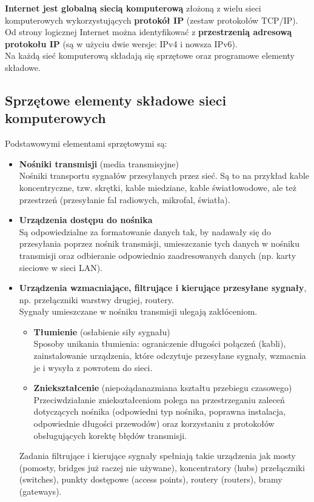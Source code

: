 \documentclass[a4paper]{article}
\begin{document}
\textbf{Internet jest globalną	 siecią	 komputerową} złożoną z	 wielu	 sieci	 komputerowych wykorzystujących	 \textbf{protokół IP} (zestaw protokołów TCP/IP). Od strony	 logicznej	 Internet można	identyfikować	z	\textbf{przestrzenią	adresową	protokołu	IP}	 (są	w użyciu	dwie wersje:	IPv4 i nowsza IPv6).\\
Na	każdą	sieć	komputerową	składają	się	sprzętowe	oraz	programowe	elementy	składowe.

\subsection{Sprzętowe	elementy	składowe	sieci	komputerowych}
Podstawowymi	elementami	sprzętowymi	są:
\begin{itemize}
    \item \textbf{Nośniki	transmisji}	(media	transmisyjne)\\
    Nośniki	 transportu	 sygnałów	 przesyłanych	 przez	 sieć. Są to na przykład kable koncentryczne, tzw.
    skrętki, kable miedziane,  kable	 światłowodowe,	 ale	 też	 przestrzeń (przesyłanie	fal	radiowych,	mikrofal,	światła).
    \item \textbf{Urządzenia	dostępu do	nośnika}\\
    Są odpowiedzialne za	formatowanie danych	tak, by nadawały się do	 przesyłania poprzez nośnik	 transmisji, umieszczanie	 tych	 danych	 w nośniku	transmisji	oraz	odbieranie	odpowiednio zaadresowanych	danych	(np. karty sieciowe w sieci LAN).
    \item \textbf{Urządzenia	wzmacniające,	filtrujące	i	kierujące	przesyłane	sygnały},	np.	przełączniki warstwy	drugiej, routery.\\
    Sygnały	 umieszczane w	 nośniku transmisji ulegają zakłóceniom.
    \begin{itemize}
        \item \textbf{Tłumienie} (osłabienie siły sygnału)\\
        Sposoby unikania tłumienia:  ograniczenie	 długości	 połączeń	 (kabli), zainstalowanie	urządzenia,	które odczytuje	przesyłane	sygnały,	wzmacnia	je	i
        wysyła	z	powrotem	do	sieci.
        \item \textbf{Zniekształcenie} (niepożądanazmiana kształtu przebiegu czasowego)\\
        Przeciwdziałanie	 zniekształceniom polega	 na	 przestrzeganiu	 zaleceń dotyczących	 nośnika	 (odpowiedni typ nośnika, poprawna instalacja, odpowiednie	 długości	 przewodów) oraz korzystaniu z protokołów obsługujących korektę	błędów	transmisji.
    \end{itemize}
    Zadania	filtrujące	i	kierujące	sygnały	spełniają	takie	urządzenia	jak	mosty (pomosty,	bridges już	 raczej	 nie	 używane),	 koncentratory (hubs)	 przełączniki (switches), punkty	 dostępowe (access points), routery (routers),	bramy (gateways).
\end{itemize}
\end{document}
